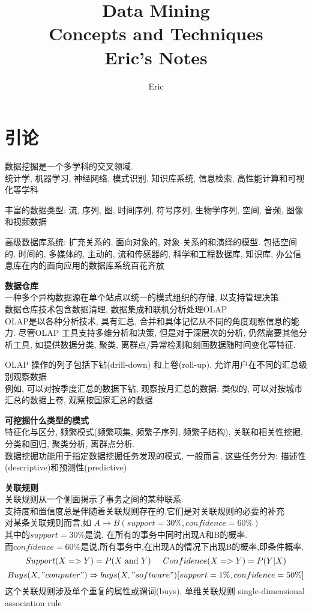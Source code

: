 \documentclass{article}
\begin{document}
\title{Data Mining \\ Concepts and Techniques \\Eric's Notes}
\author{Eric}
\maketitle
\newpage
\tableofcontents
\newpage
\section{引论}
数据挖掘是一个多学科的交叉领域.\\
统计学, 机器学习, 神经网络, 模式识别, 知识库系统, 信息检索, 高性能计算和可视化等学科

丰富的数据类型:
流, 序列, 图, 时间序列, 符号序列, 生物学序列, 空间, 音频, 图像和视频数据

高级数据库系统: 扩充关系的, 面向对象的, 对象-关系的和演绎的模型. 包括空间的, 时间的, 多媒体的, 主动的, 流和传感器的, 科学和工程数据库, 知识库, 办公信息库在内的面向应用的数据库系统百花齐放

\textbf{数据仓库}\\
一种多个异构数据源在单个站点以统一的模式组织的存储, 以支持管理决策.\\
数据仓库技术包含数据清理, 数据集成和联机分析处理OLAP\\
OLAP是以各种分析技术, 具有汇总, 合并和具体记忆从不同的角度观察信息的能力. 尽管OLAP 工具支持多维分析和决策, 但是对于深层次的分析, 仍然需要其他分析工具, 如提供数据分类, 聚类, 离群点/异常检测和刻画数据随时间变化等特征.

OLAP 操作的列子包括下钻(drill-down) 和上卷(roll-up), 允许用户在不同的汇总级别观察数据\\
例如, 可以对按季度汇总的数据下钻, 观察按月汇总的数据. 类似的, 可以对按城市汇总的数据上卷, 观察按国家汇总的数据

\textbf{可挖掘什么类型的模式}\\
特征化与区分, 频繁模式(频繁项集, 频繁子序列, 频繁子结构), 关联和相关性挖掘, 分类和回归, 聚类分析, 离群点分析.\\
数据挖掘功能用于指定数据挖掘任务发现的模式, 一般而言, 这些任务分为: 描述性(descriptive)和预测性(predictive)

\textbf{关联规则}\\
关联规则从一个侧面揭示了事务之间的某种联系.\\
支持度和置信度总是伴随着关联规则存在的,它们是对关联规则的必要的补充\\
对某条关联规则而言,如 $A \rightarrow B (support=30\%, confidence= 60\%)$\\
其中的$support=30\%$是说, 在所有的事务中同时出现A和B的概率.\\
而$confidence=60\%$是说,所有事务中,在出现A的情况下出现B的概率,即条件概率.
$$
Support(X=>Y) = P(X \text{ and } Y) \hspace{0.5cm}
Confidence(X=>Y) = P(Y | X)
$$
$$Buys(X, "computer") \Rightarrow buys (X,"software") [support = 1\%, confidence = 50\%]$$
这个关联规则涉及单个重复的属性或谓词(buys), 单维关联规则 single-dimensional association rule
\end{document}
